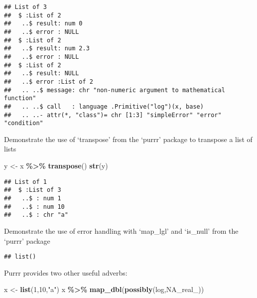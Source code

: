 \documentclass[
]{article}
\newenvironment{Shaded}{\begin{snugshade}}{\end{snugshade}}
\newcommand{\CommentTok}[1]{\textcolor[rgb]{0.56,0.35,0.01}{\textit{#1}}}
\newcommand{\ConstantTok}[1]{\textcolor[rgb]{0.56,0.35,0.01}{#1}}
\newcommand{\DecValTok}[1]{\textcolor[rgb]{0.00,0.00,0.81}{#1}}
\newcommand{\FunctionTok}[1]{\textcolor[rgb]{0.13,0.29,0.53}{\textbf{#1}}}
\newcommand{\NormalTok}[1]{#1}
\newcommand{\OtherTok}[1]{\textcolor[rgb]{0.56,0.35,0.01}{#1}}
\newcommand{\SpecialCharTok}[1]{\textcolor[rgb]{0.81,0.36,0.00}{\textbf{#1}}}
\newcommand{\StringTok}[1]{\textcolor[rgb]{0.31,0.60,0.02}{#1}}
\begin{document}
\begin{verbatim}
## List of 3
##  $ :List of 2
##   ..$ result: num 0
##   ..$ error : NULL
##  $ :List of 2
##   ..$ result: num 2.3
##   ..$ error : NULL
##  $ :List of 2
##   ..$ result: NULL
##   ..$ error :List of 2
##   .. ..$ message: chr "non-numeric argument to mathematical function"
##   .. ..$ call   : language .Primitive("log")(x, base)
##   .. ..- attr(*, "class")= chr [1:3] "simpleError" "error" "condition"
\end{verbatim}

Demonstrate the use of `transpose' from the `purrr' package to transpose
a list of lists

\begin{Shaded}
\begin{Highlighting}[]
\NormalTok{y }\OtherTok{\textless{}{-}}\NormalTok{ x }\SpecialCharTok{\%\textgreater{}\%} \FunctionTok{transpose}\NormalTok{()}
\FunctionTok{str}\NormalTok{(y)}
\end{Highlighting}
\end{Shaded}

\begin{verbatim}
## List of 1
##  $ :List of 3
##   ..$ : num 1
##   ..$ : num 10
##   ..$ : chr "a"
\end{verbatim}

Demonstrate the use of error handling with `map\_lgl' and `is\_null'
from the `purrr' package

\begin{Shaded}
\end{Shaded}

\begin{verbatim}
## list()
\end{verbatim}

\begin{Shaded}
\end{Shaded}

Purrr provides two other useful adverbs:

\begin{Shaded}
\begin{Highlighting}[]
\NormalTok{x }\OtherTok{\textless{}{-}} \FunctionTok{list}\NormalTok{(}\DecValTok{1}\NormalTok{,}\DecValTok{10}\NormalTok{,}\StringTok{"a"}\NormalTok{)}
\NormalTok{x }\SpecialCharTok{\%\textgreater{}\%} \FunctionTok{map\_dbl}\NormalTok{(}\FunctionTok{possibly}\NormalTok{(log,}\ConstantTok{NA\_real\_}\NormalTok{))}
\end{Highlighting}
\end{Shaded}
\end{document}

